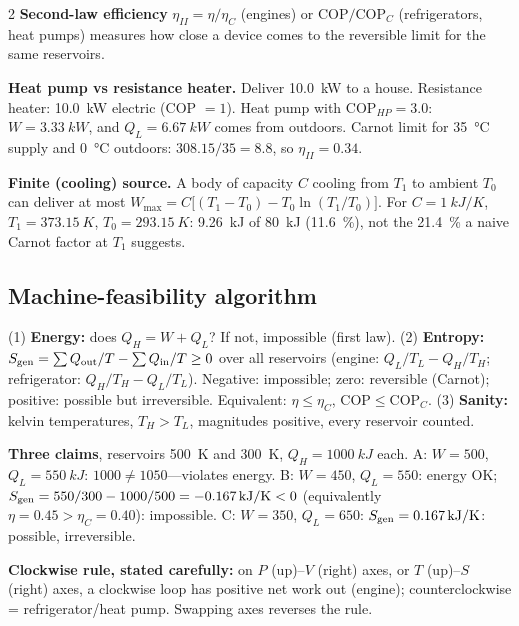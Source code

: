 \begin{multicols}{2}
\textbf{Second-law efficiency} $\eta_{II}=\eta/\eta_C$ (engines) or $\mathrm{COP}/\mathrm{COP}_C$ (refrigerators, heat pumps) measures how close a device comes to the reversible limit for the same reservoirs.

\begin{demobox}\textbf{Heat pump vs resistance heater.} Deliver \SI{10.0}{kW} to a house. Resistance heater: \SI{10.0}{kW} electric (COP $=1$). Heat pump with $\mathrm{COP}_{HP}=3.0$: $W=\SI{3.33}{kW}$, and $Q_L=\SI{6.67}{kW}$ comes from outdoors. Carnot limit for \SI{35}{\celsius} supply and \SI{0}{\celsius} outdoors: $308.15/35=8.8$, so $\eta_{II}=0.34$.\end{demobox}

\textbf{Finite (cooling) source.} A body of capacity $C$ cooling from $T_1$ to ambient $T_0$ can deliver at most $W_{\max}=C\big[(T_1-T_0)-T_0\ln(T_1/T_0)\big]$. For $C=\SI{1}{kJ/K}$, $T_1=\SI{373.15}{K}$, $T_0=\SI{293.15}{K}$: \SI{9.26}{kJ} of \SI{80}{kJ} (\SI{11.6}{\percent}), not the \SI{21.4}{\percent} a naive Carnot factor at $T_1$ suggests.

\subsection{Machine-feasibility algorithm}\label{sec:feasibility}
\CORE{}
\begin{keybox}(1) \textbf{Energy:} does $Q_H=W+Q_L$? If not, impossible (first law). (2) \textbf{Entropy:} $S_{\mathrm{gen}}=\sum Q_{\text{out}}/T-\sum Q_{\text{in}}/T\ge0$ over all reservoirs (engine: $Q_L/T_L-Q_H/T_H$; refrigerator: $Q_H/T_H-Q_L/T_L$). Negative: impossible; zero: reversible (Carnot); positive: possible but irreversible. Equivalent: $\eta\le\eta_C$, $\mathrm{COP}\le\mathrm{COP}_C$. (3) \textbf{Sanity:} kelvin temperatures, $T_H>T_L$, magnitudes positive, every reservoir counted.\end{keybox}

\begin{demobox}\textbf{Three claims}, reservoirs \SI{500}{K} and \SI{300}{K}, $Q_H=\SI{1000}{kJ}$ each.
A: $W=500$, $Q_L=\SI{550}{kJ}$: $1000\ne1050$---violates energy.
B: $W=450$, $Q_L=550$: energy OK; $S_{\mathrm{gen}}=550/300-1000/500=\SI{-0.167}{kJ/K}<0$ (equivalently $\eta=0.45>\eta_C=0.40$): impossible.
C: $W=350$, $Q_L=650$: $S_{\mathrm{gen}}=\SI{+0.167}{kJ/K}$: possible, irreversible.\end{demobox}

\textbf{Clockwise rule, stated carefully:} on $P$ (up)--$V$ (right) axes, or $T$ (up)--$S$ (right) axes, a clockwise loop has positive net work out (engine); counterclockwise = refrigerator/heat pump. Swapping axes reverses the rule.


\end{multicols}
